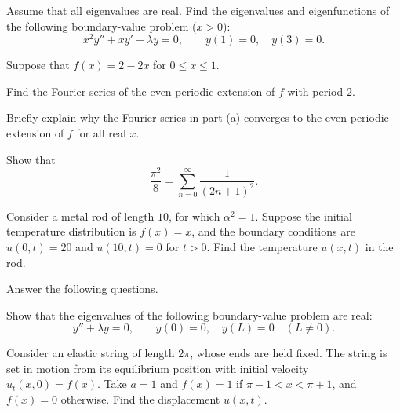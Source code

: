 \documentclass[11pt,oneside]{article}
\begin{document}
\begin{problem}
Assume that all eigenvalues are real. Find the eigenvalues and eigenfunctions of the following boundary-value problem ($x>0$):
\[
x^2y''+xy'-\lambda y=0,\qquad y(1)=0,\quad y(3)=0.
\]
\end{problem}

\begin{problem}
Suppose that $f(x)=2-2x$ for $0\le x\le1$.
\begin{problemsubparts}
\item Find the Fourier series of the even periodic extension of $f$ with period $2$.
\item Briefly explain why the Fourier series in part (a) converges to the even periodic extension of $f$ for all real $x$.
\item Show that
\[
\frac{\pi^2}{8}=\sum_{n=0}^{\infty}\frac1{(2n+1)^2}.
\]
\end{problemsubparts}
\end{problem}

\begin{problem}
Consider a metal rod of length $10$, for which $\alpha^2=1$. Suppose the initial temperature distribution is $f(x)=x$, and the boundary conditions are $u(0,t)=20$ and $u(10,t)=0$ for $t>0$. Find the temperature $u(x,t)$ in the rod.
\end{problem}

\begin{problem}
Answer the following questions.
\begin{problemsubparts}
\item Show that the eigenvalues of the following boundary-value problem are real:
\[
y''+\lambda y=0,\qquad y(0)=0,\quad y(L)=0\quad(L\ne0).
\]
\item Consider an elastic string of length $2\pi$, whose ends are held fixed. The string is set in motion from its equilibrium position with initial velocity $u_t(x,0)=f(x)$. Take $a=1$ and $f(x)=1$ if $\pi-1<x<\pi+1$, and $f(x)=0$ otherwise. Find the displacement $u(x,t)$.
\end{problemsubparts}
\end{problem}
\end{document}
